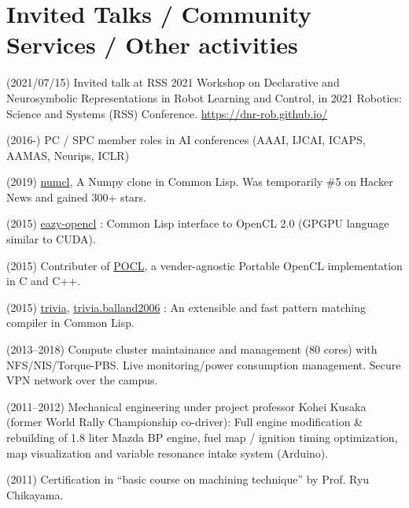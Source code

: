 \documentclass[letterpaper,11pt]{article}
\begin{document}
\section{Invited Talks / Community Services / Other activities}


(2021/07/15) Invited talk at RSS 2021 Workshop on Declarative and Neurosymbolic Representations in Robot Learning and Control,
in 2021 Robotics: Science and Systems (RSS) Conference. \url{https://dnr-rob.github.io/}

(2016-) PC / SPC member roles in AI conferences (AAAI, IJCAI, ICAPS, AAMAS, Neurips, ICLR)

(2019) \href{https://github.com/numcl/numcl}{numcl},
A Numpy clone in Common Lisp. Was temporarily \#5 on Hacker News and gained 300+ stars.

(2015) \href{https://github.com/guicho271828/eazy-opencl}{eazy-opencl}
: Common Lisp interface to OpenCL 2.0 (GPGPU language similar to CUDA).

(2015) Contributer of \href{https://github.com/pocl/pocl}{POCL},
a vender-agnostic Portable OpenCL implementation in C and C++.

(2015) \href{https://github.com/guicho271828/trivia}{trivia},
\href{https://github.com/guicho271828/trivia.balland2006}{trivia.balland2006}
: An extensible and fast pattern matching compiler in Common Lisp.


(2013--2018)
 Compute cluster maintainance and management (80 cores) with NFS/NIS/Torque-PBS.
 Live monitoring/power consumption management.
 Secure VPN network over the campus.

(2011--2012) Mechanical engineering under project professor Kohei Kusaka (former World Rally
 Championship co-driver):
 Full engine modification \& rebuilding of 1.8 liter Mazda BP engine,
 fuel map / ignition timing optimization, map visualization and
 variable resonance intake system (Arduino).

(2011) Certification in ``basic course on machining technique'' by Prof. Ryu Chikayama.


\end{document}
